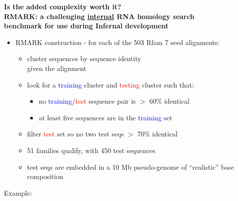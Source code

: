 \documentclass[landscape]{slides}
\begin{document}
\begin{slide}
\begin{center}
\textbf{Is the added complexity worth it? \\
  RMARK: a challenging \underline{internal} RNA homology search \\
  benchmark for use during Infernal development}
\end{center}
\medskip
\begin{minipage}{7in}
\small
\begin{itemize}
\item
  RMARK construction - for each of the 503 Rfam 7 seed alignments:
  \begin{itemize}
  \item 
    cluster sequences by sequence identity \\ given the alignment
  \item 
    look for a \textcolor{blue}{training} cluster and
    \textcolor{red}{testing} cluster such that: 
    \begin{itemize}
    \item
      no \textcolor{blue}{training}/\textcolor{red}{test} sequence pair is $>$ 60\% identical
    \item
      at least five sequences are in the \textcolor{blue}{training} set
    \end{itemize}
  \item
    filter \textcolor{red}{test} set so no two test seqs $>$ 70\% identical 
  \item
    51 families qualify, with 450 test sequences
  \item
    test seqs are embedded in a 10 Mb pseudo-genome of ``realistic'' base composition
  \end{itemize}
\end{itemize}
\vspace{1.5in}
\end{minipage}
\hspace{0.1in}
\begin{minipage}{3.5in}
  Example: 
\vspace{0.2in}


\end{minipage}
\end{slide}
\end{document}
